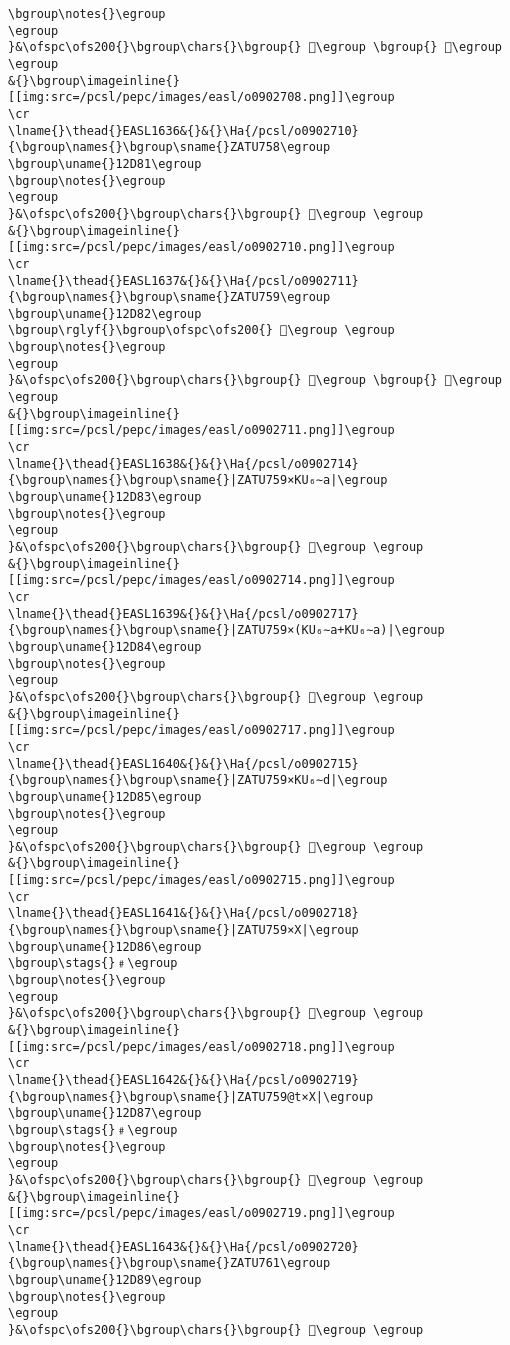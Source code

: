 \begin{verbatim}
\bgroup\notes{}\egroup
\egroup
}&\ofspc\ofs200{}\bgroup\chars{}\bgroup{} 𒵿\egroup \bgroup{} 𒶀\egroup \egroup
&{}\bgroup\imageinline{}[[img:src=/pcsl/pepc/images/easl/o0902708.png]]\egroup
\cr
\lname{}\thead{}EASL1636&{}&{}\Ha{/pcsl/o0902710}{\bgroup\names{}\bgroup\sname{}ZATU758\egroup
\bgroup\uname{}12D81\egroup
\bgroup\notes{}\egroup
\egroup
}&\ofspc\ofs200{}\bgroup\chars{}\bgroup{} 𒶁\egroup \egroup
&{}\bgroup\imageinline{}[[img:src=/pcsl/pepc/images/easl/o0902710.png]]\egroup
\cr
\lname{}\thead{}EASL1637&{}&{}\Ha{/pcsl/o0902711}{\bgroup\names{}\bgroup\sname{}ZATU759\egroup
\bgroup\uname{}12D82\egroup
\bgroup\rglyf{}\bgroup\ofspc\ofs200{} 𒶂\egroup \egroup
\bgroup\notes{}\egroup
\egroup
}&\ofspc\ofs200{}\bgroup\chars{}\bgroup{} 𒶈\egroup \bgroup{} 𒶂\egroup \egroup
&{}\bgroup\imageinline{}[[img:src=/pcsl/pepc/images/easl/o0902711.png]]\egroup
\cr
\lname{}\thead{}EASL1638&{}&{}\Ha{/pcsl/o0902714}{\bgroup\names{}\bgroup\sname{}|ZATU759×KU₆∼a|\egroup
\bgroup\uname{}12D83\egroup
\bgroup\notes{}\egroup
\egroup
}&\ofspc\ofs200{}\bgroup\chars{}\bgroup{} 𒶃\egroup \egroup
&{}\bgroup\imageinline{}[[img:src=/pcsl/pepc/images/easl/o0902714.png]]\egroup
\cr
\lname{}\thead{}EASL1639&{}&{}\Ha{/pcsl/o0902717}{\bgroup\names{}\bgroup\sname{}|ZATU759×(KU₆∼a+KU₆∼a)|\egroup
\bgroup\uname{}12D84\egroup
\bgroup\notes{}\egroup
\egroup
}&\ofspc\ofs200{}\bgroup\chars{}\bgroup{} 𒶄\egroup \egroup
&{}\bgroup\imageinline{}[[img:src=/pcsl/pepc/images/easl/o0902717.png]]\egroup
\cr
\lname{}\thead{}EASL1640&{}&{}\Ha{/pcsl/o0902715}{\bgroup\names{}\bgroup\sname{}|ZATU759×KU₆∼d|\egroup
\bgroup\uname{}12D85\egroup
\bgroup\notes{}\egroup
\egroup
}&\ofspc\ofs200{}\bgroup\chars{}\bgroup{} 𒶅\egroup \egroup
&{}\bgroup\imageinline{}[[img:src=/pcsl/pepc/images/easl/o0902715.png]]\egroup
\cr
\lname{}\thead{}EASL1641&{}&{}\Ha{/pcsl/o0902718}{\bgroup\names{}\bgroup\sname{}|ZATU759×X|\egroup
\bgroup\uname{}12D86\egroup
\bgroup\stags{}﹟\egroup
\bgroup\notes{}\egroup
\egroup
}&\ofspc\ofs200{}\bgroup\chars{}\bgroup{} 𒶆\egroup \egroup
&{}\bgroup\imageinline{}[[img:src=/pcsl/pepc/images/easl/o0902718.png]]\egroup
\cr
\lname{}\thead{}EASL1642&{}&{}\Ha{/pcsl/o0902719}{\bgroup\names{}\bgroup\sname{}|ZATU759@t×X|\egroup
\bgroup\uname{}12D87\egroup
\bgroup\stags{}﹟\egroup
\bgroup\notes{}\egroup
\egroup
}&\ofspc\ofs200{}\bgroup\chars{}\bgroup{} 𒶇\egroup \egroup
&{}\bgroup\imageinline{}[[img:src=/pcsl/pepc/images/easl/o0902719.png]]\egroup
\cr
\lname{}\thead{}EASL1643&{}&{}\Ha{/pcsl/o0902720}{\bgroup\names{}\bgroup\sname{}ZATU761\egroup
\bgroup\uname{}12D89\egroup
\bgroup\notes{}\egroup
\egroup
}&\ofspc\ofs200{}\bgroup\chars{}\bgroup{} 𒶉\egroup \egroup

\end{verbatim}
